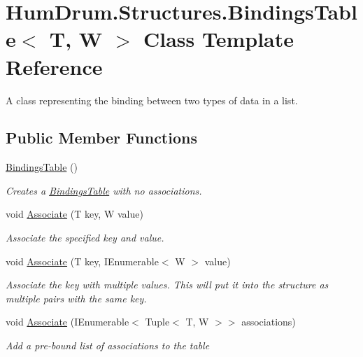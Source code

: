\hypertarget{classHumDrum_1_1Structures_1_1BindingsTable}{}\section{Hum\+Drum.\+Structures.\+Bindings\+Table$<$ T, W $>$ Class Template Reference}
\label{classHumDrum_1_1Structures_1_1BindingsTable}


A class representing the binding between two types of data in a list.  


\subsection*{Public Member Functions}
\begin{DoxyCompactItemize}
\item 
\hyperlink{classHumDrum_1_1Structures_1_1BindingsTable_a0352c5a77bed26f1353c4da475367f58}{Bindings\+Table} ()
\begin{DoxyCompactList}\small\item\em Creates a \hyperlink{classHumDrum_1_1Structures_1_1BindingsTable}{Bindings\+Table} with no associations. \end{DoxyCompactList}\item 
void \hyperlink{classHumDrum_1_1Structures_1_1BindingsTable_a16918e78532225c7f7ca16171b4c26f6}{Associate} (T key, W value)
\begin{DoxyCompactList}\small\item\em Associate the specified key and value. \end{DoxyCompactList}\item 
void \hyperlink{classHumDrum_1_1Structures_1_1BindingsTable_a10f46eaead700c94b07e92c58b98a3b5}{Associate} (T key, I\+Enumerable$<$ W $>$ value)
\begin{DoxyCompactList}\small\item\em Associate the key with multiple values. This will put it into the structure as multiple pairs with the same key. \end{DoxyCompactList}\item 
void \hyperlink{classHumDrum_1_1Structures_1_1BindingsTable_a5ccaf6e4b55a1c578e35a80cea966a2b}{Associate} (I\+Enumerable$<$ Tuple$<$ T, W $>$$>$ associations)
\begin{DoxyCompactList}\small\item\em Add a pre-\/bound list of associations to the table \end{DoxyCompactList}\item 
$$
\end{DoxyCompactItemize}
